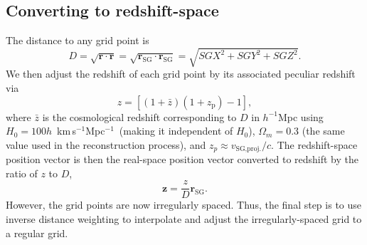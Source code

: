 \documentclass[
  journal=pasa,
  manuscript=research-paper,
  year=2022,
]{cup-journal}
\newcommand{\kmsMpc}{km\,s$^{-1}$Mpc$^{-1}$}
\newcommand{\hMpc}{$h^{-1}$Mpc}
\begin{document}
\subsection{Converting to redshift-space}
The distance to any grid point is
\begin{equation}
    D = \sqrt{\bm{r}\cdot\bm{r}} = \sqrt{\bm{r}_{\text{SG}}\cdot\bm{r}_{\text{SG}}} =\sqrt{{SGX}^2 +{SGY}^2 +{SGZ}^2}.
\end{equation}
We then adjust the redshift of each grid point by its associated peculiar redshift via
\begin{equation}
     z = [(1+\bar{z})(1+z_{\text{p}}) -1],
\end{equation}
where $\bar{z}$ is the cosmological redshift corresponding to $D$ in \hMpc{} using $H_0=100h$~\kmsMpc\ (making it independent of $H_0$), $\Omega_m = 0.3$ (the same value used in the reconstruction process), and $z_p \approx v_{\text{SG,proj.}}/c$.
The redshift-space position vector is then the real-space position vector converted to redshift by the ratio of $z$ to $D$,
\begin{equation}
\bm{z}= \frac{z}{D} \bm{r}_{\text{SG}}.
\end{equation}
However, the grid points are now irregularly spaced.
Thus, the final step is to use inverse distance weighting to interpolate and adjust the irregularly-spaced grid to a regular grid.
\end{document}
